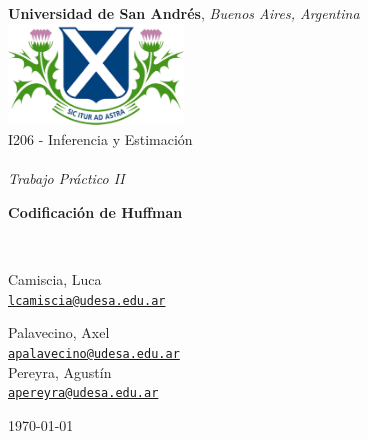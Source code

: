 \documentclass[a4paper, 10pt]{article}
\begin{document}
\begin{titlepage}
    \centering
    {\large \textbf{Universidad de San Andrés}, \textit{Buenos Aires, Argentina}} \\
    \vspace{0.2cm}
    \bigskip
    \includegraphics[width=0.35\textwidth]{figures/udesa_logo.png} \\
    \vspace{1cm}
    {\large  I206 - Inferencia y Estimación} \\
    \vspace{0.2cm}
    \noindent\hrulefill\\
    \vspace{0.5cm}
    {\Large \textit{Trabajo Práctico II}} \\
    { \Huge \textbf{Codificación de Huffman} \par}
    \vspace{0.5cm}
    \noindent\hrulefill\\
    \vspace{1.5cm}
    {\Large 
    Camiscia, Luca \\
    {\large \texttt{\href{mailto:lcamiscia@udesa.edu.ar}{lcamiscia@udesa.edu.ar}}} \\[0.5em]
    \par
    Palavecino, Axel \\ 
    {\large \texttt{\href{mailto:apalavecino@udesa.edu.ar}{apalavecino@udesa.edu.ar}}} \\[0.5em]
    Pereyra, Agustín \\ 
    {\large \texttt{\href{mailto:apereyra@udesa.edu.ar}{apereyra@udesa.edu.ar}}}\\[0.5em]
    }
    \vfill
    {\today \par}
\end{titlepage}

\end{document}
